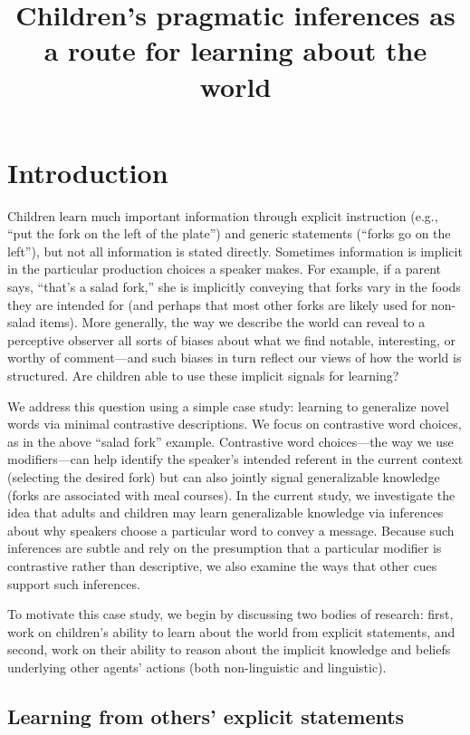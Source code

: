 \documentclass[man]{apa2}
\title{Children's pragmatic inferences as a route for learning about the world}
\begin{document}
\maketitle                            


\section{Introduction}

Children learn much important information through explicit instruction (e.g., ``put the fork on the left of the plate'') and generic statements (``forks go on the left''), but not all information is stated directly. Sometimes information is implicit in the particular production choices a speaker makes. For example, if a parent says, ``that's a salad fork,'' she is implicitly conveying that forks vary in the foods they are intended for (and perhaps that most other forks are likely used for non-salad items). More generally, the way we describe the world can reveal to a perceptive observer all sorts of biases about what we find notable, interesting, or worthy of comment---and such biases in turn reflect our views of how the world is structured. Are children able to use these implicit signals for learning? 

We address this question using a simple case study: learning to generalize novel words via minimal contrastive descriptions.  We focus on contrastive word choices, as in the above ``salad fork'' example. Contrastive word choices---the way we use modifiers---can help identify the speaker's intended referent in the current context (selecting the desired fork) but can also jointly signal generalizable knowledge (forks are associated with meal courses). In the current study, we investigate the idea that adults and children may learn generalizable knowledge via inferences about why speakers choose a particular word to convey a message. Because such inferences are subtle and rely on the presumption that a particular modifier is contrastive rather than descriptive, we also examine the ways that other cues support such inferences.

To motivate this case study, we begin by discussing two bodies of research: first, work on children's ability to learn about the world from explicit statements, and second, work on their ability to reason about the implicit knowledge and beliefs underlying other agents' actions (both non-linguistic and linguistic). 

\subsection{Learning from others' explicit statements}
\end{document}
